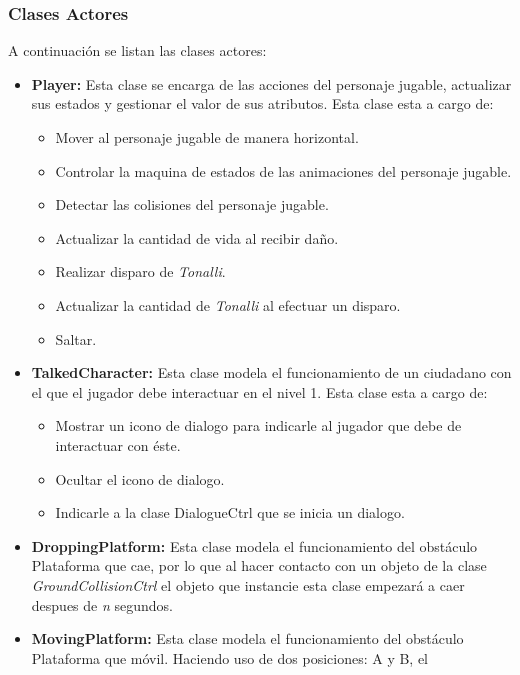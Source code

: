 \subsubsection{Clases Actores}
A continuación se listan las clases actores: 
		\begin{itemize}
			\item \textbf{Player:} Esta clase se encarga de las acciones del personaje 
			jugable, actualizar sus estados y gestionar el valor de sus atributos. 
			Esta clase esta a cargo de:
			\begin{itemize}
				\item Mover al personaje jugable de manera horizontal.
				\item Controlar la maquina de estados de las animaciones del personaje 
				jugable.
				\item Detectar las colisiones del personaje jugable.
				\item Actualizar la cantidad de vida al recibir daño.
				\item Realizar disparo de \textit{Tonalli}.
				\item Actualizar la cantidad de \textit{Tonalli} al efectuar un disparo.  
				\item Saltar. 
			\end{itemize}
			\item \textbf{TalkedCharacter:} Esta clase modela el funcionamiento de un
			ciudadano con el que el jugador debe interactuar en el nivel 1.
			Esta clase esta a cargo de:
			\begin{itemize}
				\item Mostrar un icono de dialogo para indicarle al jugador que debe de 
				interactuar con éste.
				\item Ocultar el icono de dialogo.
				\item Indicarle a la clase DialogueCtrl que se inicia un dialogo.  
			\end{itemize}
			\item \textbf{DroppingPlatform:} Esta clase modela el funcionamiento 
			del obstáculo Plataforma que cae, por lo que al hacer contacto con un objeto de 
			la clase \textit{GroundCollisionCtrl} el objeto que instancie esta clase 
			empezará a caer despues de \textit{n} segundos. 
			\item \textbf{MovingPlatform:} Esta clase modela el funcionamiento 
			del obstáculo Plataforma que móvil. Haciendo uso de dos posiciones: A y B, el 

\end{itemize}
